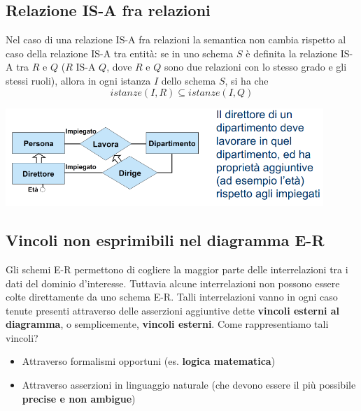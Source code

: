 \documentclass[12pt]{article}
\begin{document}
\subsection{Relazione IS-A fra relazioni}
Nel caso di una relazione IS-A fra relazioni la semantica non cambia rispetto al caso della relazione IS-A tra entità:
se in uno schema $S$ è definita la relazione IS-A tra $R$ e $Q$ ($R$ IS-A $Q$, dove $R$ e $Q$ sono due relazioni con lo stesso grado e gli stessi ruoli), allora
in ogni istanza $I$ dello schema $S$, si ha che
$$istanze(I, R) \subseteq istanze(I, Q)$$
\begin{center}
    \includegraphics[width = 0.90\textwidth]{Images/39.PNG}
\end{center}
\subsection{Vincoli non esprimibili nel diagramma E-R}
Gli schemi E-R permettono di cogliere la maggior parte delle interrelazioni tra i dati del dominio d'interesse.
Tuttavia alcune interrelazioni non possono essere colte direttamente da uno schema E-R.
Talli interrelazioni vanno in ogni caso tenute presenti attraverso delle asserzioni aggiuntive dette \textbf{vincoli esterni al diagramma}, o semplicemente, \textbf{vincoli esterni}.
Come rappresentiamo tali vincoli?
\begin{itemize}
    \item Attraverso formalismi opportuni (es. \textbf{logica matematica})
    \item Attraverso asserzioni in linguaggio naturale (che devono essere il più possibile \textbf{precise e non ambigue})
\end{itemize}
\end{document}
